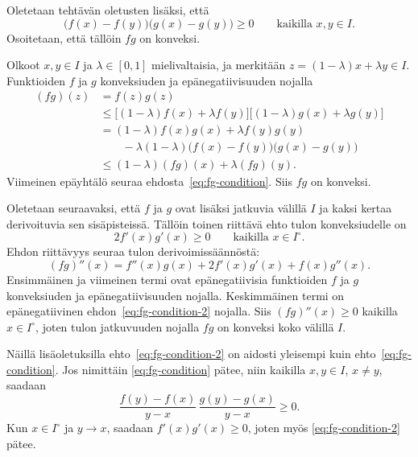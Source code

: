 \documentclass[11pt,a4paper]{amsart}
\begin{document}
\begin{solution}
  Oletetaan tehtävän oletusten lisäksi, että
  \begin{equation}\tag{*}\label{eq:fg-condition}
    \bigl(f(x) - f(y)\bigr)\bigl(g(x) - g(y)\bigr) \geq 0
    \qquad \text{kaikilla } x, y \in I.
  \end{equation}
  Osoitetaan, että tällöin \(fg\) on konveksi.

  Olkoot \(x, y \in I\) ja \(\lambda \in [0, 1]\) mielivaltaisia, ja merkitään
  \(z = (1 - \lambda)x + \lambda y \in I\).
  Funktioiden \(f\) ja \(g\) konveksiuden ja epänegatiivisuuden nojalla
  \[
    \begin{aligned}
      (fg)(z)
      &= f(z)g(z) \\
      &\leq \bigl[(1 - \lambda)f(x) + \lambda f(y)\bigr]
      \bigl[(1 - \lambda)g(x) + \lambda g(y)\bigr] \\
      &= (1 - \lambda)f(x)g(x) + \lambda f(y)g(y) \\
      &\qquad {}- \lambda(1 - \lambda)
      \bigl(f(x) - f(y)\bigr)\bigl(g(x) - g(y)\bigr) \\
      &\leq (1 - \lambda)(fg)(x) + \lambda(fg)(y).
    \end{aligned}
  \]
  Viimeinen epäyhtälö seuraa ehdosta~\eqref{eq:fg-condition}.
  Siis \(fg\) on konveksi.

  \newpage
  \begin{samepage}
    Oletetaan seuraavaksi, että \(f\) ja \(g\) ovat lisäksi jatkuvia
    välillä \(I\) ja kaksi kertaa derivoituvia sen sisäpisteissä.
    Tällöin toinen riittävä ehto tulon konveksiudelle on
    \begin{equation}\tag{**}\label{eq:fg-condition-2}
      2f'(x)g'(x) \geq 0
      \qquad \text{kaikilla } x \in I^\circ.
    \end{equation}
    Ehdon riittävyys seuraa tulon derivoimissäännöstä:
    \[
      (fg)''(x)
      = f''(x)g(x) + 2f'(x)g'(x) + f(x)g''(x).
    \]
    Ensimmäinen ja viimeinen termi ovat epänegatiivisia funktioiden
    \(f\) ja \(g\) konveksiuden ja epänegatiivisuuden nojalla.
    Keskimmäinen termi on epänegatiivinen ehdon~\eqref{eq:fg-condition-2}
    nojalla. Siis \((fg)''(x) \geq 0\) kaikilla \(x \in I^\circ\),
    joten tulon jatkuvuuden nojalla \(fg\) on konveksi koko välillä \(I\).\par
  \end{samepage}

  Näillä lisäoletuksilla ehto~\eqref{eq:fg-condition-2} on aidosti
  yleisempi kuin ehto~\eqref{eq:fg-condition}.
  Jos nimittäin \eqref{eq:fg-condition} pätee, niin kaikilla
  \(x, y \in I\), \(x \ne y\), saadaan
  \[
    \frac{f(y) - f(x)}{y - x}\,
    \frac{g(y) - g(x)}{y - x} \geq 0.
  \]
  Kun \(x \in I^\circ\) ja \(y \to x\), saadaan
  \(f'(x)g'(x) \geq 0\), joten myös
  \eqref{eq:fg-condition-2} pätee.


\end{solution}
\end{document}
